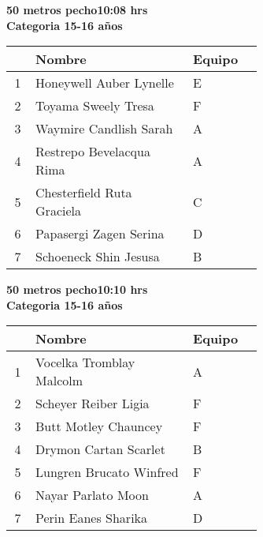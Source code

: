 \begin{minipage}{0.95\linewidth}\vspace{0.5cm} 
\begin{flushleft}
\textbf{
\hspace{-0.15cm}50 metros pecho\hspace{1.5cm}10:08 hrs \\Categoria 15-16 años}\vspace{-0.2cm} 
\end{flushleft}
\begin{tabular}{cp{0.63\linewidth}l}
\hline
& \textbf{Nombre} & \textbf{Equipo} \\ \hline
1 & Honeywell Auber Lynelle & E \\ 
2 & Toyama Sweely Tresa & F \\ 
3 & Waymire Candlish Sarah & A \\ 
4 & Restrepo Bevelacqua Rima & A \\ 
5 & Chesterfield Ruta Graciela & C \\ 
6 & Papasergi Zagen Serina & D \\ 
7 & Schoeneck Shin Jesusa & B \\ 
\end{tabular}
\end{minipage}
\begin{minipage}{0.95\linewidth}\vspace{0.5cm} 
\begin{flushleft}
\textbf{
\hspace{-0.15cm}50 metros pecho\hspace{1.5cm}10:10 hrs \\Categoria 15-16 años}\vspace{-0.2cm} 
\end{flushleft}
\begin{tabular}{cp{0.63\linewidth}l}
\hline
& \textbf{Nombre} & \textbf{Equipo} \\ \hline
1 & Vocelka Tromblay Malcolm & A \\ 
2 & Scheyer Reiber Ligia & F \\ 
3 & Butt Motley Chauncey & F \\ 
4 & Drymon Cartan Scarlet & B \\ 
5 & Lungren Brucato Winfred & F \\ 
6 & Nayar Parlato Moon & A \\ 
7 & Perin Eanes Sharika & D \\ 
\end{tabular}
\end{minipage}
